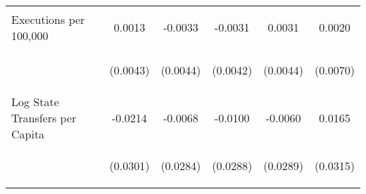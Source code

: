 \begin{center}
\begin{tabular}{lccccc}
\noalign{\smallskip}Executions per 100,000 & \begin{scriptsize}0.0013\end{scriptsize} & \begin{scriptsize}-0.0033\end{scriptsize} & \begin{scriptsize}-0.0031\end{scriptsize} & \begin{scriptsize}0.0031\end{scriptsize} & \begin{scriptsize}0.0020\end{scriptsize}\\
 & \begin{scriptsize}(0.0043)\end{scriptsize} & \begin{scriptsize}(0.0044)\end{scriptsize} & \begin{scriptsize}(0.0042)\end{scriptsize} & \begin{scriptsize}(0.0044)\end{scriptsize} & \begin{scriptsize}(0.0070)\end{scriptsize}\\
\noalign{\smallskip}Log State Transfers per Capita & \begin{scriptsize}-0.0214\end{scriptsize} & \begin{scriptsize}-0.0068\end{scriptsize} & \begin{scriptsize}-0.0100\end{scriptsize} & \begin{scriptsize}-0.0060\end{scriptsize} & \begin{scriptsize}0.0165\end{scriptsize}\\
 & \begin{scriptsize}(0.0301)\end{scriptsize} & \begin{scriptsize}(0.0284)\end{scriptsize} & \begin{scriptsize}(0.0288)\end{scriptsize} & \begin{scriptsize}(0.0289)\end{scriptsize} & \begin{scriptsize}(0.0315)\end{scriptsize}\\

\end{tabular}
\end{center}
